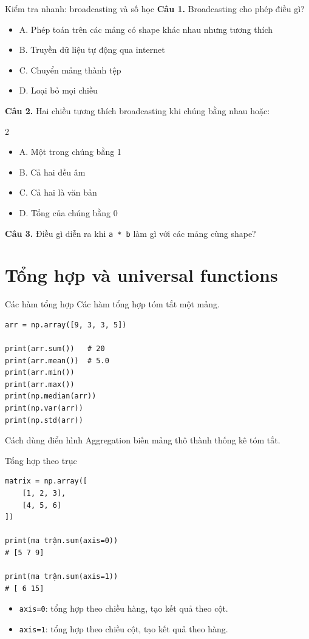 \documentclass[aspectratio=169,11pt]{beamer}
\newcommand{\quiztitle}[1]{\textbf{\textcolor{QuizOrange}{#1}}}
\begin{document}
\begin{frame}{Kiểm tra nhanh: broadcasting và số học}
\small
\quiztitle{Câu 1.} Broadcasting cho phép điều gì?
\begin{itemize}
  \item A. Phép toán trên các mảng có shape khác nhau nhưng tương thích
  \item B. Truyền dữ liệu tự động qua internet
  \item C. Chuyển mảng thành tệp
  \item D. Loại bỏ mọi chiều
\end{itemize}
\quiztitle{Câu 2.} Hai chiều tương thích broadcasting khi chúng bằng nhau hoặc:
\begin{multicols}{2}
\begin{itemize}
  \item A. Một trong chúng bằng 1
  \item B. Cả hai đều âm
  \item C. Cả hai là văn bản
  \item D. Tổng của chúng bằng 0
\end{itemize}
\end{multicols}
\quiztitle{Câu 3.} Điều gì diễn ra khi \texttt{a * b} làm gì với các mảng cùng shape?
\end{frame}

\section{Tổng hợp và universal functions}

\begin{frame}[fragile]{Các hàm tổng hợp}
\small
Các hàm tổng hợp tóm tắt một mảng.
\begin{lstlisting}[style=py]
arr = np.array([9, 3, 3, 5])

print(arr.sum())   # 20
print(arr.mean())  # 5.0
print(arr.min())
print(arr.max())
print(np.median(arr))
print(np.var(arr))
print(np.std(arr))
\end{lstlisting}
\begin{block}{Cách dùng điển hình}
Aggregation biến mảng thô thành thống kê tóm tắt.
\end{block}
\end{frame}

\begin{frame}[fragile]{Tổng hợp theo trục}
\small
\begin{lstlisting}[style=py]
matrix = np.array([
    [1, 2, 3],
    [4, 5, 6]
])

print(ma trận.sum(axis=0))
# [5 7 9]

print(ma trận.sum(axis=1))
# [ 6 15]
\end{lstlisting}
\begin{itemize}
  \item \texttt{axis=0}: tổng hợp theo chiều hàng, tạo kết quả theo cột.
  \item \texttt{axis=1}: tổng hợp theo chiều cột, tạo kết quả theo hàng.
\end{itemize}
\end{frame}
\end{document}
